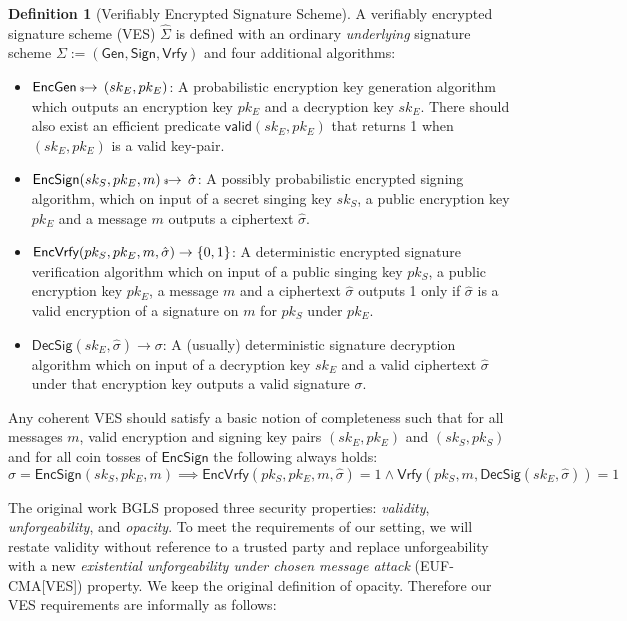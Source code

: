 \documentclass[fullpage]{article}
\theoremstyle{definition}
\newtheorem{definition}{Definition}[section]
\newcommand{\EUFCMAVES}{\textsf{EUF-CMA}[\textsf{VES}]\xspace}
\newcommand{\EncGen}{\textsf{EncGen}}
\newcommand{\EncSign}{\textsf{EncSign}}
\newcommand{\EncVer}{\textsf{EncVrfy}}
\newcommand{\DecSig}{\textsf{DecSig}}
\newcommand{\KeyGen}{\textsf{Gen}}
\newcommand{\Sign}{\textsf{Sign}}
\newcommand{\Verify}{\textsf{Vrfy}}
\newcommand{\SIGNALG}{\KeyGen, \Sign, \Verify}
\newcommand{\skSign}{sk_S}
\newcommand{\pkSign}{pk_S}
\newcommand{\kSign}{(\skSign,\pkSign)}
\newcommand{\skEnc}{sk_E}
\newcommand{\pkEnc}{pk_E}
\newcommand{\kEnc}{(\skEnc, \pkEnc)}
\newcommand{\hatsigma}{\hat{\sigma}}
\newcommand{\hatSigma}{\hat{\Sigma}}
\begin{document}
\begin{definition}[Verifiably Encrypted Signature Scheme]
\label{VES}
 A verifiably encrypted signature scheme (VES) $\hatSigma$ is defined with an ordinary \emph{underlying} signature scheme $\Sigma := (\SIGNALG)$ and four additional algorithms:
    \begin{itemize}
        \item $\EncGen \rightsample \kEnc$: A probabilistic encryption key generation algorithm which outputs an encryption key $\pkEnc$ and a decryption key $\skEnc$. There should also exist an efficient predicate $\textsf{valid}\kEnc$ that returns 1 when $\kEnc$ is a valid key-pair.
        \item $\EncSign(\skSign, \pkEnc, m) \rightsample \hatsigma$: A possibly probabilistic encrypted signing algorithm, which on input of a secret singing key $\skSign$, a public encryption key $\pkEnc$ and a message $m$ outputs a ciphertext $\hatsigma$.
        \item $\EncVer(\pkSign, \pkEnc, m, \hatsigma) \rightarrow \bin$: A deterministic encrypted signature verification algorithm which on input of a public singing key $\pkSign$, a public encryption key $\pkEnc$, a message $m$ and a ciphertext $\hatsigma$ outputs 1 only if $\hatsigma$ is a valid encryption of a signature on $m$ for $\pkSign$ under $\pkEnc$.
        \item $\DecSig(\skEnc, \hatsigma) \rightarrow \sigma$: A (usually) deterministic signature decryption algorithm which on input of a decryption key $\skEnc$ and a valid ciphertext $\hatsigma$ under that encryption key  outputs a valid signature $\sigma$.
    \end{itemize}

Any coherent VES should satisfy a basic notion of completeness such that for all messages $m$, valid encryption and signing key pairs $\kEnc$ and $\kSign$ and for all coin tosses of $\EncSign$ the following always holds:
    \[ \hatsigma = \EncSign(\skSign, \pkEnc, m) \implies \EncVer(\pkSign, \pkEnc, m, \hatsigma) = 1 \land \Verify(\pkSign, m, \DecSig(\skEnc, \hatsigma)) = 1 \]
\end{definition}

The original work BGLS proposed three security properties: \emph{validity}, \emph{unforgeability}, and \emph{opacity}. To meet the requirements of our setting, we will restate validity without reference to a trusted party and replace unforgeability with a new \emph{existential unforgeability under chosen message attack} (\EUFCMAVES) property. We keep the original definition of opacity. Therefore our VES requirements are informally as follows:
\end{document}
